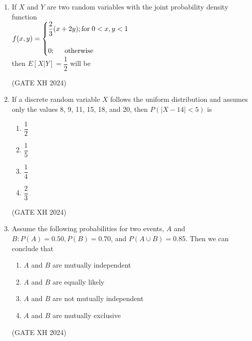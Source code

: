 \documentclass{article}
\begin{document}
\begin{enumerate}
    \item If $X$ and $Y$ are two random variables with the joint probability density function \\ 
    $f(x,y)=\begin{cases}
        \dfrac{2}{3}(x+2y); \text{for} \hspace{0.1cm} 0<x,y<1 \\ \\
        0; \hspace{0.5cm} \text{otherwise}
    \end{cases}$ \\
    then $E[X|Y]=\dfrac{1}{2}$ will be

    \begin{enumerate}
     \hfill (GATE XH 2024)
    \end{enumerate}

    \item If a discrete random variable $X$ follows the uniform distribution and assumes only the values 8, 9, 11, 15, 18, and 20, then $P(|X-14|<5)$ is 

    \begin{multicols}{4}
        \begin{enumerate}
            \item $\dfrac{1}{2}$
            \item $\dfrac{1}{5}$
            \item $\dfrac{1}{4}$
            \item $\dfrac{2}{3}$
        \end{enumerate}
    \end{multicols} \hfill (GATE XH 2024)

    \item Assume the following probabilities for two events, $A$ and $B: P(A)=0.50, P(B)=0.70$, and $P(A \cup B)=0.85$. Then we can conclude that 

    \begin{multicols}{2}
    \begin{enumerate}
        \item $A$ and $B$ are mutually independent 
        \item $A$ and $B$ are equally likely
        \item $A$ and $B$ are not mutually independent
        \item $A$ and $B$ are mutually exclusive
    \end{enumerate}
    \end{multicols} \hfill (GATE XH 2024)


\end{enumerate}
\end{document}
